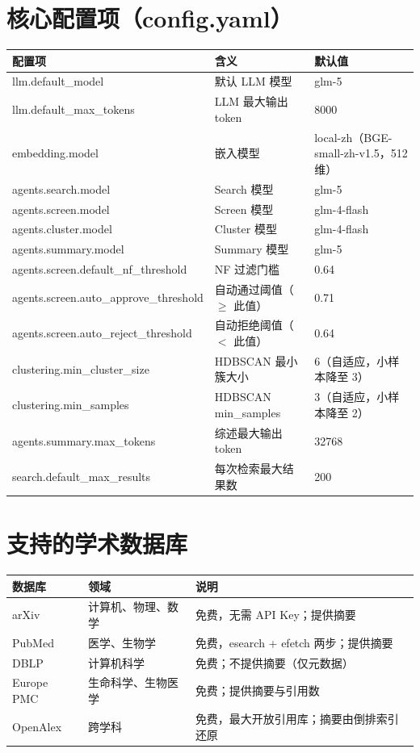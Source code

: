 \documentclass[10pt,a4paper]{article}
\begin{document}
\section{核心配置项（config.yaml）}
\begin{center}\footnotesize
\begin{tabularx}{\linewidth}{lYl}
\toprule
\textbf{配置项} & \textbf{含义} & \textbf{默认值} \\
\midrule
llm.default\_model        & 默认 LLM 模型 & glm-5 \\
llm.default\_max\_tokens  & LLM 最大输出 token & 8000 \\
embedding.model           & 嵌入模型 & local-zh（BGE-small-zh-v1.5，512 维） \\
agents.search.model       & Search 模型 & glm-5 \\
agents.screen.model       & Screen 模型 & glm-4-flash \\
agents.cluster.model      & Cluster 模型 & glm-4-flash \\
agents.summary.model      & Summary 模型 & glm-5 \\
agents.screen.default\_nf\_threshold & NF 过滤门槛 & 0.64 \\
agents.screen.auto\_approve\_threshold & 自动通过阈值（$\geq$ 此值） & 0.71 \\
agents.screen.auto\_reject\_threshold  & 自动拒绝阈值（$<$ 此值） & 0.64 \\
clustering.min\_cluster\_size & HDBSCAN 最小簇大小 & 6（自适应，小样本降至 3） \\
clustering.min\_samples       & HDBSCAN min\_samples & 3（自适应，小样本降至 2） \\
agents.summary.max\_tokens    & 综述最大输出 token & 32768 \\
search.default\_max\_results & 每次检索最大结果数 & 200 \\
\bottomrule
\end{tabularx}
\end{center}

\section{支持的学术数据库}
\begin{center}\footnotesize
\begin{tabularx}{\linewidth}{lYY}
\toprule
\textbf{数据库} & \textbf{领域} & \textbf{说明} \\
\midrule
arXiv      & 计算机、物理、数学   & 免费，无需 API Key；提供摘要 \\
PubMed     & 医学、生物学         & 免费，esearch + efetch 两步；提供摘要 \\
DBLP       & 计算机科学           & 免费；不提供摘要（仅元数据） \\
Europe PMC & 生命科学、生物医学   & 免费；提供摘要与引用数 \\
OpenAlex   & 跨学科               & 免费，最大开放引用库；摘要由倒排索引还原 \\
\bottomrule
\end{tabularx}
\end{center}
\end{document}
